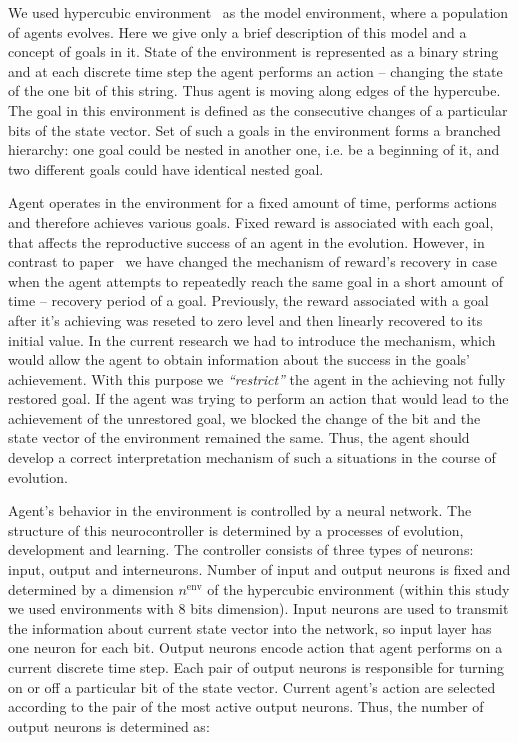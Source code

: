 \documentclass[letterpaper]{article}
\begin{document}
We used hypercubic environment~\citep{LakhmanBurtsev2013} as the model environment, where a population of agents evolves. Here we give only a brief description of this model and a concept of goals in it. State of the environment is represented as a binary string and at each discrete time step the agent performs an action -- changing the state of the one bit of this string. Thus agent is moving along edges of the hypercube. The goal in this environment is defined as the consecutive changes of a particular bits of the state vector. Set of such a goals in the environment forms a branched hierarchy: one goal could be nested in another one, i.e. be a beginning of it, and two different goals could have identical nested goal.     

Agent operates in the environment for a fixed amount of time, performs actions and therefore achieves various goals. Fixed reward is associated with each goal, that affects the reproductive success of an agent in the evolution. However, in contrast to paper~\citep{LakhmanBurtsev2013} we have changed the mechanism of reward's recovery in case when the agent attempts to repeatedly reach the same goal in a short amount of time -- recovery period of a goal. Previously, the reward associated with a goal after it's achieving was reseted to zero level and then linearly recovered to its initial value. In the current research we had to introduce the mechanism, which would allow the agent to obtain information about the success in the goals' achievement. With this purpose we {\em ``restrict''} the agent in the achieving not fully restored goal. If the agent was trying to perform an action that would lead to the achievement of the unrestored goal, we blocked the change of the bit and the state vector of the environment remained the same. Thus, the agent should develop a correct interpretation mechanism of such a situations in the course of evolution. 

Agent's behavior in the environment is controlled by a neural network. The structure of this neurocontroller is determined by a processes of evolution, development and learning. The controller consists of three types of neurons: input, output and interneurons. Number of input and output neurons is fixed and determined by a dimension $n^{\mathrm{env}}$ of the hypercubic environment (within this study we used environments with 8 bits dimension). Input neurons are used to transmit the information about current state vector into the network, so input layer has one neuron for each bit. Output neurons encode action that agent performs on a current discrete time step. Each pair of output neurons is responsible for turning on or off a particular bit of the state vector. Current agent's action are selected according to the pair of the most active output neurons. Thus, the number of output neurons is determined as:
\end{document}
